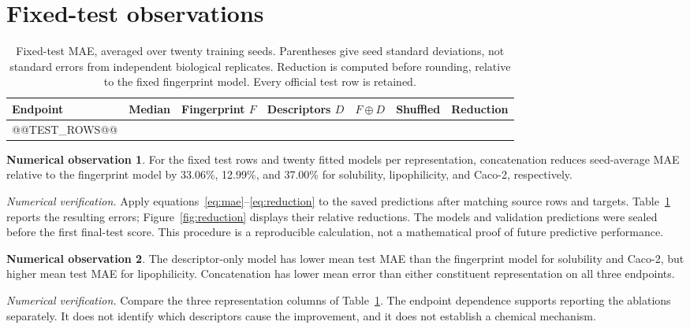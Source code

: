 \documentclass[10pt,twocolumn,a4paper]{article}
\theoremstyle{definition}\newtheorem{observation}{Numerical observation}
\theoremstyle{remark}\newtheorem{remark}{Remark}
\begin{document}
\section{Fixed-test observations}\label{sec:results}
\begin{table}[t]
\centering
\caption{Fixed-test MAE, averaged over twenty training seeds. Parentheses give seed standard deviations, not standard errors from independent biological replicates. Reduction is computed before rounding, relative to the fixed fingerprint model. Every official test row is retained.}\label{tab:test}
\small
\begin{tabular}{lrrrrrr}\toprule
Endpoint & Median & Fingerprint $F$ & Descriptors $D$ & $F\oplus D$ & Shuffled & Reduction\\\midrule
@@TEST_ROWS@@
\bottomrule\end{tabular}
\end{table}
\begin{observation}\label{obs:test}
For the fixed test rows and twenty fitted models per representation, concatenation reduces seed-average MAE relative to the fingerprint model by 33.06\%, 12.99\%, and 37.00\% for solubility, lipophilicity, and Caco-2, respectively.
\end{observation}
\noindent\textit{Numerical verification.} Apply equations~\eqref{eq:mae}--\eqref{eq:reduction} to the saved predictions after matching source rows and targets. Table~\ref{tab:test} reports the resulting errors; Figure~\ref{fig:reduction} displays their relative reductions. The models and validation predictions were sealed before the first final-test score. This procedure is a reproducible calculation, not a mathematical proof of future predictive performance.

\begin{observation}\label{obs:ablation}
The descriptor-only model has lower mean test MAE than the fingerprint model for solubility and Caco-2, but higher mean test MAE for lipophilicity. Concatenation has lower mean error than either constituent representation on all three endpoints.
\end{observation}
\noindent\textit{Numerical verification.} Compare the three representation columns of Table~\ref{tab:test}. The endpoint dependence supports reporting the ablations separately. It does not identify which descriptors cause the improvement, and it does not establish a chemical mechanism.
\end{document}
